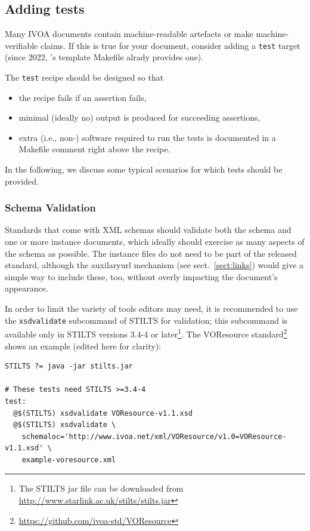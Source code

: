 \documentclass[11pt,a4paper]{ivoa}
\begin{document}
\subsection{Adding tests}

Many IVOA documents contain machine-readable artefacts or make
machine-verifiable claims.  If this is true for your document, consider
adding a \verb|test| target (since 2022, \ivoatex's template Makefile
alrady provides one).

The \verb|test| recipe should be designed so that

\begin{itemize}
\item the recipe fails if an assertion fails,
\item minimal (ideally no) output is produced for succeeding assertions,
\item extra (i.e., non-\ivoatex) software required to run the tests is
documented in a Makefile comment right above the recipe.
\end{itemize}

In the following, we discuss some typical scenarios for which tests
should be provided.

\subsubsection{Schema Validation}

Standards that come with XML schemas should validate both the schema and
one or more instance documents, which ideally should exercise as many
aspects of the schema as possible.  The instance files do not need to be
part of the released standard, although the auxilaryurl mechanism (see
sect.~\ref{sect:links}) would give a simple way to include these, too,
without overly impacting the document's appearance.

In order to limit the variety of tools editors may need, it is
recommended to use the \verb|xsdvalidate| subcommand of STILTS
\citep{2006ASPC..351..666T} for validation; this subcommand is available
only in STILTS versions 3.4-4 or later\footnote{The STILTS jar file can be
downloaded from \url{http://www.starlink.ac.uk/stilts/stilts.jar}}.
The VOResource
standard\footnote{\url{https://github.com/ivoa-std/VOResource}} shows an
example (edited here for clarity):

\begin{lstlisting}[basicstyle=\footnotesize]
STILTS ?= java -jar stilts.jar

# These tests need STILTS >=3.4-4
test:
  @$(STILTS) xsdvalidate VOResource-v1.1.xsd
  @$(STILTS) xsdvalidate \
    schemaloc='http://www.ivoa.net/xml/VOResource/v1.0=VOResource-v1.1.xsd' \
    example-voresource.xml
\end{lstlisting}
\end{document}
